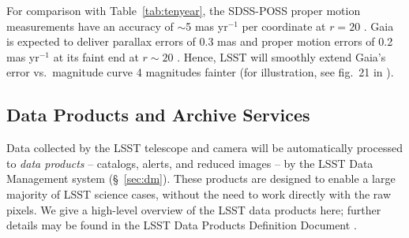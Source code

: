 For comparison with Table~\ref{tab:tenyear}, the SDSS-POSS proper motion measurements have an
accuracy of $\sim$5 mas yr$^{-1}$ per coordinate at $r=20$ \citep{2004AJ....127.3034M}. Gaia
is expected to deliver parallax errors of 0.3 mas and proper motion errors of
0.2 mas yr$^{-1}$ at its faint end at $r\sim20$ \citep{2001A&A...369..339P}. Hence, LSST will smoothly
extend Gaia's error vs.\ magnitude curve 4 magnitudes fainter (for illustration,
see fig.~21 in \citealt{2012ARA&A..50..251I}).

\subsection{             Data Products and Archive Services          }
\label{Sec:dp}

Data collected by the LSST telescope and camera will be automatically processed to \emph{data products} -- catalogs, alerts,
and reduced images -- by the LSST Data Management system
(\S~\ref{sec:dm}). These products are designed to
enable a large majority of LSST science cases, without the need to
work directly with the raw pixels.  We give a high-level overview of
the LSST data products here; further details may be found in the LSST
Data Products Definition Document \citep{LSE-163}.

